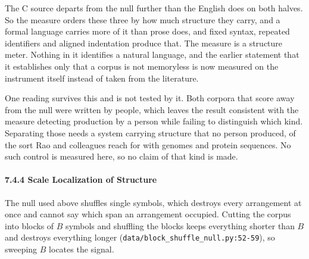 The C source departs from the null further than the English does on both halves. So the measure orders these three by how much structure they carry, and a formal language carries more of it than prose does, and fixed syntax, repeated identifiers and aligned indentation produce that. The measure is a structure meter. Nothing in it identifies a natural language, and the earlier statement that it establishes only that a corpus is not memoryless is now measured on the instrument itself instead of taken from the literature.

One reading survives this and is not tested by it. Both corpora that score away from the null were written by people, which leaves the result consistent with the measure detecting production by a person while failing to distinguish which kind. Separating those needs a system carrying structure that no person produced, of the sort Rao and colleagues reach for with genomes and protein sequences. No such control is measured here, so no claim of that kind is made.

\paragraph{7.4.4 Scale Localization of Structure}

The null used above shuffles single symbols, which destroys every arrangement at once and cannot say which span an arrangement occupied. Cutting the corpus into blocks of \(B\) symbols and shuffling the blocks keeps everything shorter than \(B\) and destroys everything longer (\texttt{data/\allowbreak{}block\_\allowbreak{}shuffle\_\allowbreak{}null.\allowbreak{}py:52-\allowbreak{}59}), so sweeping \(B\) locates the signal.

